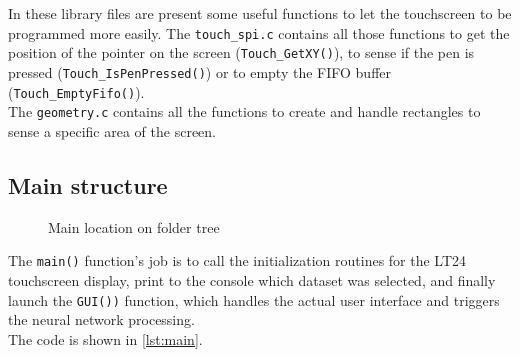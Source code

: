 \noindent
In these library files are present some useful functions to let the touchscreen to be programmed more easily. The \texttt{touch\_spi.c} contains all those functions to get the position of the pointer on the screen (\texttt{Touch\_GetXY()}), to sense if the pen is pressed (\texttt{Touch\_IsPenPressed()}) or to empty the FIFO buffer (\texttt{Touch\_EmptyFifo()}). \\
The \texttt{geometry.c} contains all the functions to create and handle rectangles to sense a specific area of the screen. 

\subsection{Main structure}

\begin{figure}[h!]
    \begin{center}
    \end{center}

    \caption{Main location on folder tree}
    \label{fig:main_folder_tree}
    
\end{figure}

\noindent
The \texttt{main()} function's job is to call the initialization routines for the LT24 touchscreen display, print to the console which dataset was selected, and finally launch the \texttt{GUI())} function, which handles the actual user interface and triggers the neural network processing. \\
The code is shown in \autoref{lst:main}.

